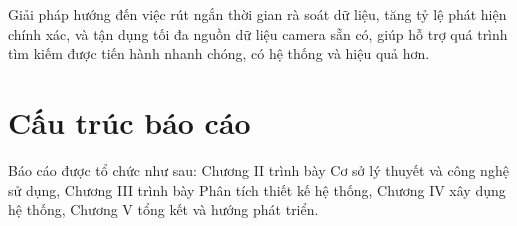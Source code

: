 \documentclass[../DoAn.tex]{subfiles}
\begin{document}
Giải pháp hướng đến việc rút ngắn thời gian rà soát dữ liệu, tăng tỷ lệ phát hiện chính xác, và tận dụng tối đa nguồn dữ liệu camera sẵn có, giúp hỗ trợ quá trình tìm kiếm được tiến hành nhanh chóng, có hệ thống và hiệu quả hơn.
\section{Cấu trúc báo cáo}
Báo cáo được tổ chức như sau: Chương II trình bày Cơ sở lý thuyết và công nghệ sử dụng, Chương III trình bày Phân tích thiết kế hệ thống, Chương IV xây dụng hệ thống, Chương V tổng kết và hướng phát triển.
\end{document}
